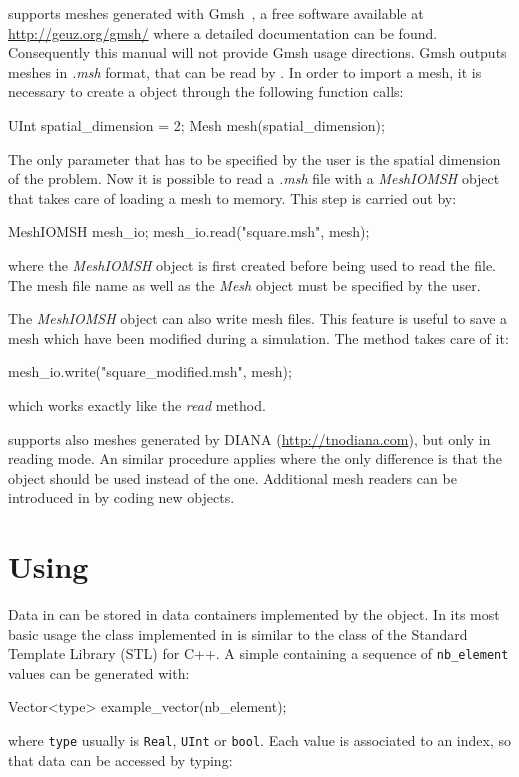 \akantu supports meshes generated with Gmsh~\cite{gmsh}, a free
software available at \url{http://geuz.org/gmsh/} where a detailed 
documentation can be found. Consequently this manual will not provide
Gmsh usage directions. Gmsh outputs meshes in \textit{.msh} format, that can be read
by \akantu. In order to import a mesh, it is necessary to create
a  object through the following function calls:
\begin{cpp}
  UInt spatial_dimension = 2;
  Mesh mesh(spatial_dimension);
\end{cpp}
The only parameter that has to be specified by the user is the spatial
dimension of the problem. Now it is possible to read a \textit{.msh} file with
a \textit{MeshIOMSH} object that takes care of loading a mesh to memory. 
This step is carried out by:
\begin{cpp}
  MeshIOMSH mesh_io;
  mesh_io.read("square.msh", mesh);
\end{cpp}
where the \textit{MeshIOMSH} object is first created before being 
used to read the  file. The mesh file name as well as the \textit{Mesh}
object must be specified by the user. 

The \textit{MeshIOMSH} object can also write mesh files. This
feature is useful to save a mesh which have been modified during a
simulation. The  method takes care of it:
\begin{cpp}
  mesh_io.write("square_modified.msh", mesh);
\end{cpp}
which works exactly like the \textit{read} method.

\akantu supports also meshes generated by
DIANA (\url{http://tnodiana.com}), but only in reading mode. An similar
procedure applies where the only
difference is that the  object should be used
instead of the  one. Additional mesh readers can be
introduced in \akantu by coding new  objects.

\section{Using }

Data in \akantu can be stored in data containers implemented by
the  object. In its most basic usage the  class
implemented in \akantu is similar to the  class of
the Standard Template Library (STL) for C++. A simple 
containing a sequence of \texttt{nb\_element} values can be generated with:
\begin{cpp}
  Vector<type> example_vector(nb_element);
\end{cpp}
where \texttt{type} usually is \texttt{Real}, \texttt{UInt} or
\texttt{bool}. Each value is associated to an index, so that data can be
accessed by typing:

